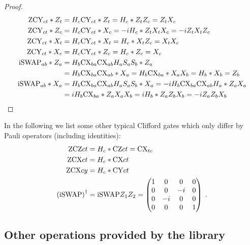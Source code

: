 \documentclass[a4paper,english]{scrartcl}
\begin{document}
\begin{proof}
\begin{align}
  \zcy_{ct}*Z_t &= H_c\cy_{ct} * Z_t = H_c * Z_tZ_c = Z_tX_c\\
  \zcy_{ct}*Z_c &= H_c\cy_{ct} * X_c = -i H_c * Z_tX_tX_c = -iZ_tX_tZ_c\\
  \zcy_{ct}*X_t &= H_c\cy_{ct} * X_t = H_c * X_tZ_c = X_tX_c\\
  \zcy_{ct}*X_c &= H_c\cy_{ct} * Z_c = H_c * Z_c = X_c\\
  \iSwap_{ab} * Z_a &= H_b \cx_{ba} \cx_{ab} H_a S_a S_b * Z_a\\
  &= H_b \cx_{ba} \cx_{ab} * X_a = H_b \cx_{ba} * X_a X_b = H_b * X_b = Z_b\\
  \iSwap_{ab} * X_a &= H_b \cx_{ba} \cx_{ab} H_a S_a S_b * X_a = -iH_b \cx_{ba} \cx_{ab}
  H_a * Z_aX_a\\
  &= iH_b \cx_{ba} * Z_aX_aX_b = iH_b * Z_aZ_bX_b = -i Z_aZ_bX_b
\end{align}
\end{proof}
\begin{remark}
In the following we list some other typical Clifford gates which only differ by Pauli
operators (including identities):
\begin{align}
  \zcz{ct} &= H_c * \cz{ct} = \cx_{tc}\\
  \zcx{ct} &= H_c * \cx{ct}\\
  \zcx{cy} &= H_c * \cy{ct}\\
  \w(\iSwap)\ur &= \iSwap Z_1Z_2 = \matp{1&0&0&0\\0&0&-i&0\\0&-i&0&0\\0&0&0&1}\;.
\end{align}
\end{remark}

\subsection{Other operations provided by the library}
\end{document}

